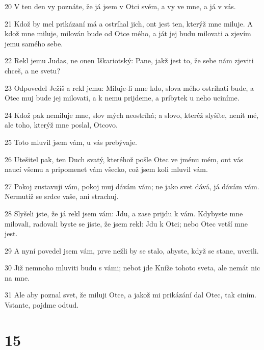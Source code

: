 \par 20 V ten den vy poznáte, že já jsem v Otci svém, a vy ve mne, a já v vás.
\par 21 Kdož by mel prikázaní má a ostríhal jich, ont jest ten, kterýž mne miluje. A kdož mne miluje, milován bude od Otce mého, a ját jej budu milovati a zjevím jemu samého sebe.
\par 22 Rekl jemu Judas, ne onen Iškariotský: Pane, jakž jest to, že sebe nám zjeviti chceš, a ne svetu?
\par 23 Odpovedel Ježíš a rekl jemu: Miluje-li mne kdo, slova mého ostríhati bude, a Otec muj bude jej milovati, a k nemu prijdeme, a príbytek u neho uciníme.
\par 24 Kdož pak nemiluje mne, slov mých neostríhá; a slovo, kteréž slyšíte, nenít mé, ale toho, kterýž mne poslal, Otcovo.
\par 25 Toto mluvil jsem vám, u vás prebývaje.
\par 26 Utešitel pak, ten Duch svatý, kteréhož pošle Otec ve jménu mém, ont vás naucí všemu a pripomenet vám všecko, což jsem koli mluvil vám.
\par 27 Pokoj zustavuji vám, pokoj muj dávám vám; ne jako svet dává, já dávám vám. Nermutiž se srdce vaše, ani strachuj.
\par 28 Slyšeli jste, že já rekl jsem vám: Jdu, a zase prijdu k vám. Kdybyste mne milovali, radovali byste se jiste, že jsem rekl: Jdu k Otci; nebo Otec vetší mne jest.
\par 29 A nyní povedel jsem vám, prve nežli by se stalo, abyste, když se stane, uverili.
\par 30 Již nemnoho mluviti budu s vámi; nebot jde Kníže tohoto sveta, ale nemát nic na mne.
\par 31 Ale aby poznal svet, že miluji Otce, a jakož mi prikázání dal Otec, tak ciním. Vstante, pojdme odtud.

\chapter{15}

